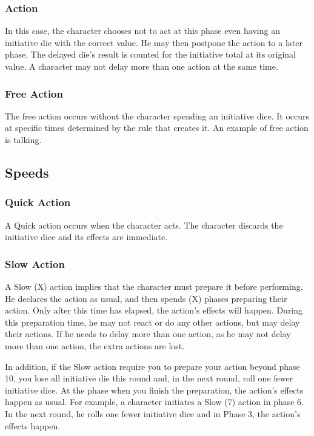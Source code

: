 \begin{multicols}{2}
\subsubsection{Action}
In this case, the character chooses not to
act at this phase even having an initiative die with
the correct value. He may then postpone the action
to a later phase. The delayed die’s result is counted
for the initiative total at its original value. A
character may not delay more than one action at
the same time.

\subsubsection{Free Action}
The free action occurs without the
character spending an initiative dice. It occurs at
specific times determined by the rule that creates
it. An example of free action is talking.

\subsection{Speeds}
\label{subsec:speeds}
\subsubsection{Quick Action}
A Quick action occurs when the character
acts. The character discards the initiative dice and
its effects are immediate.

\subsubsection{Slow Action}
A Slow (X) action implies that the
character must prepare it before performing. He
declares the action as usual, and then spends (X)
phases preparing their action. Only after this time
has elapsed, the action’s effects will happen.
During this preparation time, he may not react or
do any other actions, but may delay their actions.
If he needs to delay more than one action, as he
may not delay more than one action, the extra
actions are lost.

In addition, if the Slow action require you
to prepare your action beyond phase 10, you lose
all initiative die this round and, in the next round,
roll one fewer initiative dice. At the phase when
you finish the preparation, the action’s effects
happen as usual. For example, a character initiates
a Slow (7) action in phase 6. In the next round, he
rolls one fewer initiative dice and in Phase 3, the
action’s effects happen.


\end{multicols}
